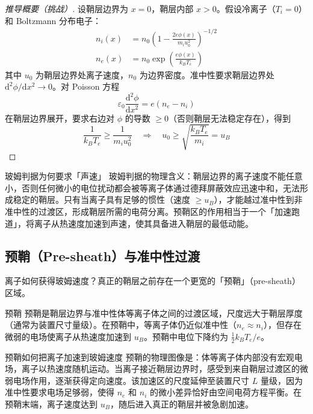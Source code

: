 \documentclass[12pt,a4paper,openany,oneside]{book}
\newcommand{\diff}{\mathrm{d}}
\newcommand{\eps}{\varepsilon}
\begin{document}
\begin{proof}[推导概要（挑战）]
设鞘层边界为 $x=0$，鞘层内部 $x>0$。假设冷离子（$T_i = 0$）和 Boltzmann 分布电子：
\begin{align}
n_i(x) &= n_0 \left(1 - \frac{2e\phi(x)}{m_i u_0^2}\right)^{-1/2} \\
n_e(x) &= n_0 \exp\!\left(\frac{e\phi(x)}{k_B T_e}\right)
\label{eq:ch11-sheath-densities}
\end{align}
其中 $u_0$ 为鞘层边界处离子速度，$n_0$ 为边界密度。准中性要求鞘层边界处 $\diff^2\phi/\diff x^2 \to 0$。对 Poisson 方程
\begin{equation}
\eps_0 \frac{\diff^2\phi}{\diff x^2} = e(n_e - n_i)
\label{eq:ch11-sheath-poisson}
\end{equation}
在鞘层边界展开，要求右边对 $\phi$ 的导数 $\ge 0$（否则鞘层无法稳定存在），得到
\begin{equation}
\frac{1}{k_B T_e} \ge \frac{1}{m_i u_0^2} \quad\Rightarrow\quad u_0 \ge \sqrt{\frac{k_B T_e}{m_i}} = u_B
\label{eq:ch11-bohm-criterion}
\end{equation}
\end{proof}

\begin{insight}{玻姆判据为何要求「声速」}{}
玻姆判据的物理含义：鞘层边界的离子速度不能任意小，否则任何微小的电位扰动都会被等离子体通过德拜屏蔽效应迅速中和，无法形成稳定的鞘层。只有当离子具有足够的惯性（速度 $\ge u_B$），才能越过准中性到非准中性的过渡区，形成鞘层所需的电荷分离。预鞘区的作用相当于一个「加速跑道」，将离子从热速度加速到声速，使其具备进入鞘层的最低动能。
\end{insight}

\subsection{预鞘（Pre-sheath）与准中性过渡}

离子如何获得玻姆速度？真正的鞘层之前存在一个更宽的「预鞘」（pre-sheath）区域。

\begin{definition}{预鞘}{}{}
\label{def:pre-sheath}
预鞘是鞘层边界与准中性体等离子体之间的过渡区域，尺度远大于鞘层厚度（通常为装置尺寸量级）。在预鞘中，等离子体仍近似准中性（$n_e \approx n_i$），但存在微弱的电场使离子从热速度加速到 $u_B$。预鞘中电位下降约为 $\frac{1}{2}k_B T_e/e$。
\end{definition}

\begin{insight}{预鞘如何把离子加速到玻姆速度}{}
预鞘的物理图像是：体等离子体内部没有宏观电场，离子以热速度随机运动。当离子接近鞘层边界时，感受到来自鞘层过渡区的微弱电场作用，逐渐获得定向速度。该加速区的尺度延伸至装置尺寸 $L$ 量级，因为准中性要求电场足够弱，使得 $n_e$ 和 $n_i$ 的微小差异恰好由空间电荷方程平衡。在预鞘末端，离子速度达到 $u_B$，随后进入真正的鞘层并被急剧加速。
\end{insight}
\end{document}
